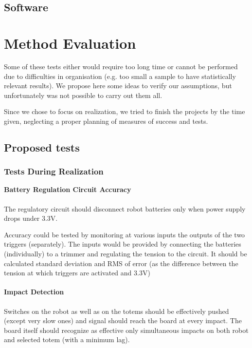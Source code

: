 \documentclass[a4paper,twoside]{book}
\newcommand{\includeDir}{include}
\begin{document}
\section{Software}
\label{sec:software}


\chapter{Method Evaluation}

Some of these tests either would require too long time or cannot be performed due to difficulties in organisation (e.g. too small a sample to have statistically relevant results). We propose here some ideas to verify our assumptions, but unfortunately was not possible to carry out them all.

Since we chose to focus on realization, we tried to finish the projects by the time given, neglecting a proper planning of measures of success and tests.
\\
\section{Proposed tests}

\subsection{Tests During Realization}

\textbf{Battery Regulation Circuit Accuracy}
\\
\\
The regulatory circuit should disconnect robot batteries only when power supply drops under 3.3V.

Accuracy could be tested by monitoring at various inputs the outputs of the two triggers (separately). The inputs would be provided by connecting the batteries (individually) to a trimmer and regulating the tension to the circuit. It should be calculated standard deviation and RMS of error (as the difference between the tension at which triggers are activated and 3.3V)
\\
\\
\textbf{Impact Detection}
\\
\\
Switches on the robot as well as on the totems should be effectively pushed (except very slow ones) and signal should reach the board at every impact.
The board itself should recognize as effective only simultaneous impacts on both robot and selected totem (with a minimum lag).
\end{document}
